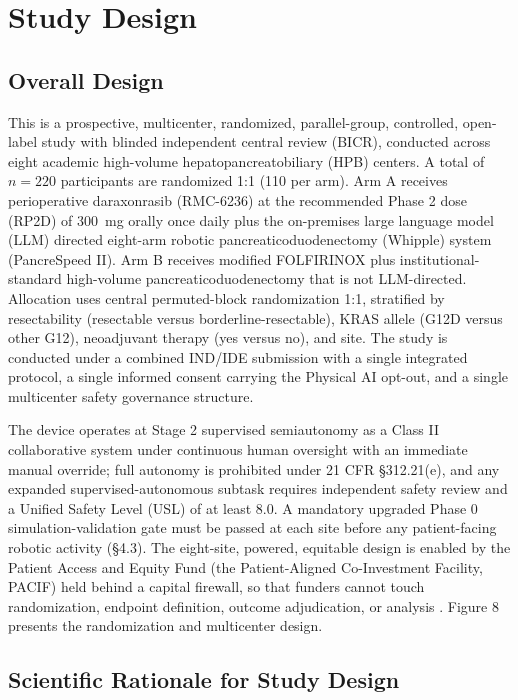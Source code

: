 \section{Study Design}

\subsection{Overall Design}

This is a prospective, multicenter, randomized, parallel-group, controlled,
open-label study with blinded independent central review (BICR), conducted across
eight academic high-volume hepatopancreatobiliary (HPB) centers. A total of
$n=220$ participants are randomized 1:1 (110 per arm). Arm A receives perioperative
daraxonrasib (RMC-6236) at the recommended Phase 2 dose (RP2D) of 300~mg orally
once daily plus the on-premises large language model (LLM) directed eight-arm
robotic pancreaticoduodenectomy (Whipple) system (PancreSpeed II). Arm B receives
modified FOLFIRINOX \cite{Conroy2018} plus institutional-standard high-volume
pancreaticoduodenectomy that is not LLM-directed. Allocation uses central
permuted-block randomization 1:1, stratified by resectability (resectable versus
borderline-resectable), KRAS allele (G12D versus other G12), neoadjuvant therapy
(yes versus no), and site. The study is conducted under a combined IND/IDE
submission with a single integrated protocol, a single informed consent carrying
the Physical AI opt-out, and a single multicenter safety governance structure.

The device operates at Stage 2 supervised semiautonomy as a Class II collaborative
system under continuous human oversight with an immediate manual override; full
autonomy is prohibited under 21 CFR \S312.21(e), and any expanded
supervised-autonomous subtask requires independent safety review and a Unified
Safety Level (USL) of at least 8.0. A mandatory upgraded Phase 0
simulation-validation gate must be passed at each site before any patient-facing
robotic activity (\S4.3). The eight-site, powered, equitable design is enabled by
the Patient Access and Equity Fund (the Patient-Aligned Co-Investment Facility,
PACIF) held behind a capital firewall, so that funders cannot touch randomization,
endpoint definition, outcome adjudication, or analysis \cite{kawchak2026hr9510,ecfr2026part54}.
Figure 8 presents the randomization and multicenter design.

\subsection{Scientific Rationale for Study Design}

